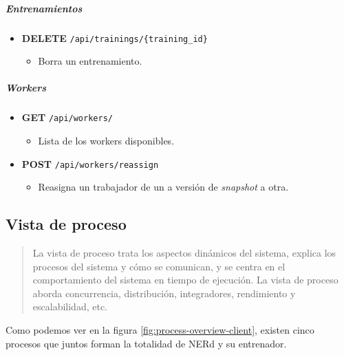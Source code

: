 \documentclass[12pt,a4paper,]{scrartcl}
\providecommand{\tightlist}{%
  \setlength{\itemsep}{0pt}\setlength{\parskip}{0pt}}
\let\oldsubparagraph\subparagraph
\renewcommand{\subparagraph}[1]{\oldsubparagraph{#1}\mbox{}}
\begin{document}
\hypertarget{entrenamientos}{%
\subparagraph{Entrenamientos}\label{entrenamientos}}

\begin{itemize}
\tightlist
\item
  \textbf{DELETE} \texttt{/api/trainings/\{training\_id\}}

  \begin{itemize}
  \tightlist
  \item
    Borra un entrenamiento.
  \end{itemize}
\end{itemize}

\hypertarget{workers}{%
\subparagraph{Workers}\label{workers}}

\begin{itemize}
\tightlist
\item
  \textbf{GET} \texttt{/api/workers/}

  \begin{itemize}
  \tightlist
  \item
    Lista de los workers disponibles.
  \end{itemize}
\item
  \textbf{POST} \texttt{/api/workers/reassign}

  \begin{itemize}
  \tightlist
  \item
    Reasigna un trabajador de un a versión de \emph{snapshot} a otra.
  \end{itemize}
\end{itemize}

\hypertarget{vista-de-proceso}{%
\subsection{Vista de proceso}\label{vista-de-proceso}}

\begin{quote}
La vista de proceso trata los aspectos dinámicos del sistema, explica los procesos del sistema y cómo se comunican, y se centra en el comportamiento del sistema en tiempo de ejecución.
La vista de proceso aborda concurrencia, distribución, integradores, rendimiento y escalabilidad, etc.
\end{quote}

Como podemos ver en la figura \ref{fig:process-overview-client}, existen cinco procesos que juntos forman la totalidad de NERd y su entrenador.
\end{document}
